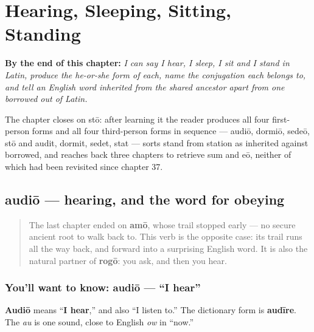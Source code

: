 
\chapter{Hearing, Sleeping, Sitting, Standing}
\label{ch:la-sense-and-posture-verbs}

\begin{chapteropening}
\textbf{By the end of this chapter:} \emph{I can say I hear, I sleep, I sit and I stand in Latin, produce the he-or-she form of each, name the conjugation each belongs to, and tell an English word inherited from the shared ancestor apart from one borrowed out of Latin.}

The chapter closes on stō: after learning it the reader produces all four first-person forms and all four third-person forms in sequence — audiō, dormiō, sedeō, stō and audit, dormit, sedet, stat — sorts stand from station as inherited against borrowed, and reaches back three chapters to retrieve sum and eō, neither of which had been revisited since chapter 37.
\end{chapteropening}

\section[audiō, audīre]{audiō — hearing, and the word for obeying}

\label{lesson:LA-C40-audio}



\begin{quote}
The last chapter ended on \textbf{amō}, whose trail stopped early — no secure ancient root to walk back to. This verb is the opposite case: its trail runs all the way back, and forward into a surprising English word. It is also the natural partner of \textbf{rogō}: you ask, and then you hear.
\end{quote}

\subsection*{You'll want to know: audiō — \textquotedblleft{}I hear\textquotedblright{}}
\textbf{Audiō} means \textquotedblleft{}\textbf{I hear},\textquotedblright{} and also \textquotedblleft{}I listen to.\textquotedblright{} The dictionary form is \textbf{audīre}. The \emph{au} is one sound, close to English \emph{ow} in \textquotedblleft{}now.\textquotedblright{}

